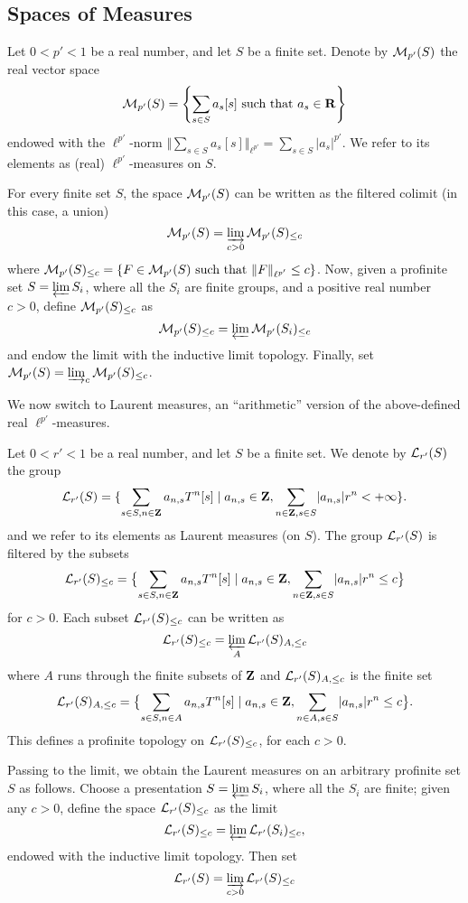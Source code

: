 \subsection{Spaces of Measures}

\begin{definition}
  \label{real-measures}
  \leanok
  Let $0 < p' < 1$ be a real number, and let $S$ be a finite set.
  Denote by $\mathcal M_{p'}(S)$ the real vector space
\[
\mathcal M_{p'}(S)=\left\{\sum_{s\in S}a_{s}[s] \text{ such that } a_{s}\in \mathbf{R}\right\}
\]
endowed with the $\ell^{p'}$-norm $\Vert \sum_{s\in S}a_s[s]\Vert_{\ell^{p'}}=\sum_{s\in S}\lvert a_s\rvert ^{p'}$. We refer to its elements as (real) $\ell^{p'}$-measures on $S$.
\end{definition}
For every finite set $S$, the space $\mathcal M_{p'}(S)$ can be written as the filtered colimit (in this case, a union)
\[
\mathcal M_{p'}(S)=\varinjlim_{c>0}\mathcal M_{p'}(S)_{\leq c}
\]
where $\mathcal M_{p'}(S)_{\leq c}=\left\{F \in \mathcal M_{p'}(S) \text{ such that } \Vert F \Vert_{\ell^{p'}}\leq c\right\}$. Now, given a profinite set $S=\varprojlim S_i$, where all the $S_i$ are finite groups, and a positive real number $c>0$, define $\mathcal M_{p'}(S)_{\leq c}$ as
\[
\mathcal M_{p'}(S)_{\leq c}=\varprojlim \mathcal M_{p'}(S_i)_{\leq c}
\]
and endow the limit with the inductive limit topology. Finally, set $\mathcal M_{p'}(S)=\varinjlim_{c}\mathcal M_{p'}(S)_{\leq c}$.

We now switch to Laurent measures, an ``arithmetic'' version of the above-defined real $\ell^{p'}$-measures.

\begin{definition}
  \label{laurent-measures-fin}
  \leanok
  Let $0 < r' < 1$ be a real number, and let $S$ be a finite set. We denote by $\mathcal L_{r'}(S)$ the group
\[
	\mathcal L_{r'}(S)=\{\sum_{s\in S,n\in \mathbf{Z}}a_{n,s}T^n[s] \mid a_{n,s}\in \mathbf{Z}, \sum_{n\in\mathbf{Z}, s\in S}\lvert a_{n,s}\rvert r^n
< + \infty\}.
\]
and we refer to its elements as Laurent measures (on $S$).
The group $\mathcal L_{r'}(S)$ is filtered by the subsets
\[
	\mathcal L_{r'}(S)_{\leq c}=\bigl\{\sum_{s\in S,n\in \mathbf{Z}}a_{n,s}T^n[s] \mid a_{n,s}\in \mathbf{Z}, \sum_{n\in\mathbf{Z}, s\in S}\lvert a_{n,s}\rvert r^n
\leq c\bigr\}
\]
for $c> 0$. Each subset $\mathcal L_{r'}(S)_{\leq c}$ can be written as
\[
\mathcal L_{r'}(S)_{\leq c}=\varprojlim_{A}\mathcal L_{r'}(S)_{A,\leq c}
\]
where $A$ runs through the finite subsets of $\mathbf{Z}$ and $\mathcal L_{r'}(S)_{A,\leq c}$ is the finite set
\[
	\mathcal L_{r'}(S)_{A,\leq c}=\bigl\{\sum_{s\in S,n\in A}a_{n,s}T^n[s] \mid a_{n,s}\in \mathbf{Z}, \sum_{n\in A, s\in S}\lvert a_{n,s}\rvert r^n\leq c\bigr\}.
\]
This defines a profinite topology on $\mathcal L_{r'}(S)_{\leq c}$, for each $c>0$.
\end{definition}
Passing to the limit, we obtain the Laurent measures on an arbitrary profinite set $S$ as follows. 
Choose a presentation $S=\varprojlim S_i$, where all the $S_i$ are finite; given any $c>0$, define the space $\mathcal L_{r'}(S)_{\leq c}$ as the limit
\[
\mathcal L_{r'}(S)_{\leq c}=\varprojlim\mathcal L_{r'}(S_i)_{\leq c},
\]
endowed with the inductive limit topology. Then set
\[
\mathcal L_{r'}(S)=\varinjlim_{c > 0}\mathcal L_{r'}(S)_{\leq c}
\]

